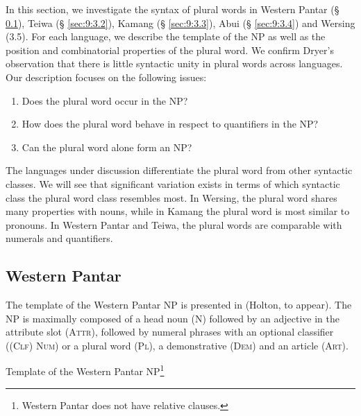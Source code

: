 In this section, we investigate the syntax of plural words in Western Pantar ({\S} \ref{sec:9:3.1}), Teiwa ({\S} \ref{sec:9:3.2}), Kamang ({\S} \ref{sec:9:3.3}), Abui ({\S} \ref{sec:9:3.4}) and Wersing (3.5). For each language, we describe the template of the NP as well as the position and combinatorial properties of the plural word. We confirm Dryer's observation that there is little syntactic unity in plural words across languages. Our description focuses on the following issues:

\begin{enumerate}
\item Does the plural word occur in the NP?
\item  How does the plural word behave in respect to quantifiers in the NP?
\item   Can the plural word alone form an NP?
\end{enumerate}

The languages under discussion differentiate the plural word from other syntactic classes. We will see that significant variation exists in terms of which syntactic class the plural word class resembles most. In Wersing, the plural word shares many properties with nouns, while in Kamang the plural word is most similar to pronouns. In Western Pantar and Teiwa, the plural words are comparable with numerals and quantifiers.

\subsection{Western Pantar}  %
\label{sec:9:3.1}
The template of the Western Pantar NP is presented in  (Holton, to appear). The NP is maximally composed of a head noun (N) followed by an adjective in the attribute slot (\textsc{Attr),} followed by numeral phrases with an optional classifier (\textsc{(Clf)} \textsc{Num)} or a plural word (\textsc{Pl),} a demonstrative \textsc{(Dem)} and an article \textsc{(Art)}. 

\ea\label{ex:9:12}
\upshape
Template of the Western Pantar NP\footnote{Western Pantar does not have relative clauses.}

